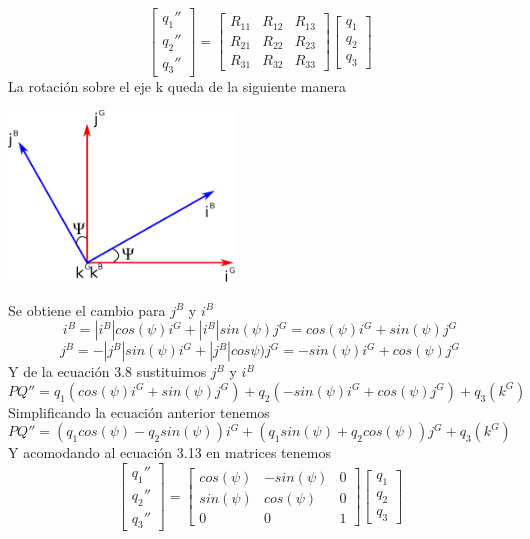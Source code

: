 \begin{equation}
	\begin{bmatrix}
		q_1'' \\
		q_2'' \\
		q_3''
	\end{bmatrix}
	=
	\begin{bmatrix}
		R_{11} & R_{12} & R_{13} \\
		R_{21} & R_{22} & R_{23} \\
		R_{31} & R_{32} & R_{33}
	\end{bmatrix}
	\begin{bmatrix}
		q_1 \\
		q_2 \\
		q_3
	\end{bmatrix}
\end{equation}
La rotación sobre el eje k queda de la siguiente manera
\begin{center}
	\includegraphics[width=0.45\textwidth]{Contenido/Cuerpo/Capitulo3/Fig15.eps}
	\label{fig:ModeloMat:Fig1}
\end{center}
Se obtiene el cambio para $j^B$ y $i^B$
\begin{equation}
	i^B = |i^B|cos(\psi)i^G + |i^B|sin(\psi)j^G = cos(\psi)i^G + sin(\psi)j^G
\end{equation}
\begin{equation}
	j^B = -|j^B|sin(\psi)i^G + |j^B|cos\psi)j^G = -sin(\psi)i^G + cos(\psi)j^G
\end{equation}
Y de la ecuación 3.8 sustituimos $j^B$ y $i^B$
\begin{equation}
	PQ'' = q_1(cos(\psi)i^G + sin(\psi)j^G) + q_2(-sin(\psi)i^G + cos(\psi)j^G) + q_3(k^G)
\end{equation}
Simplificando la ecuación anterior tenemos
\begin{equation}
	PQ''= (q_1cos(\psi) - q_2sin(\psi))i^G + (q_1sin(\psi) + q_2cos(\psi))j^G + q_3(k^G)
\end{equation}
Y acomodando al ecuación 3.13 en matrices tenemos
\begin{equation}
	\begin{bmatrix}
		q_1'' \\
		q_2'' \\
		q_3''
	\end{bmatrix}
	=
	\begin{bmatrix}
		cos(\psi) & -sin(\psi) & 0 \\
		sin(\psi) & cos(\psi) & 0 \\
		0 & 0 & 1
	\end{bmatrix}
	\begin{bmatrix}
		q_1 \\
		q_2 \\
		q_3
	\end{bmatrix}
\end{equation}
